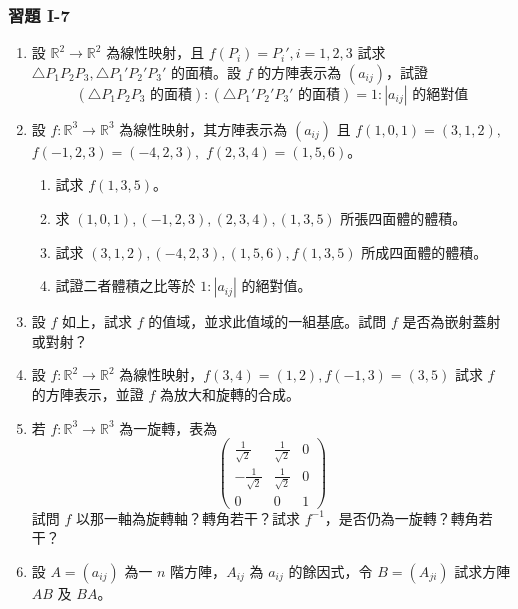 \subsubsection*{習題 I-7}\label{sec:b6-ex1-7}

\begin{enumerate}[label=\arabic*., leftmargin=2em]
  \item 設 $\mathbb{R}^2 \longrightarrow \mathbb{R}^2$ 為線性映射，且 $f(P_i)=P_i', i=1, 2, 3$ 試求 $\triangle P_1P_2P_3, \triangle P_1'P_2'P_3'$ 的面積。設 $f$ 的方陣表示為 $(a_{ij})$，試證
  \[ (\triangle P_1P_2P_3 \text{ 的面積}) : (\triangle P_1'P_2'P_3' \text{ 的面積}) = 1 : |a_{ij}| \text{ 的絕對值} \]

  \item 設 $f: \mathbb{R}^3 \longrightarrow \mathbb{R}^3$ 為線性映射，其方陣表示為 $(a_{ij})$ 且 $f(1, 0, 1) = (3, 1, 2),$ $f(-1, 2, 3) = (-4, 2, 3),$ $f(2, 3, 4) = (1, 5, 6)$。
  \begin{enumerate}[label=(\roman*)]
    \item 試求 $f(1, 3, 5)$。
    \item 求 $(1, 0, 1), (-1, 2, 3), (2, 3, 4), (1, 3, 5)$ 所張四面體的體積。
    \item 試求 $(3, 1, 2), (-4, 2, 3), (1, 5, 6), f(1, 3, 5)$ 所成四面體的體積。
    \item 試證二者體積之比等於 $1 : |a_{ij}|$ 的絕對值。
  \end{enumerate}

  \item[\textbf{*3.}] 設 $f$ 如上，試求 $f$ 的值域，並求此值域的一組基底。試問 $f$ 是否為嵌射蓋射或對射？

  \item 設 $f: \mathbb{R}^2 \longrightarrow \mathbb{R}^2$ 為線性映射，$f(3, 4) = (1, 2), f(-1, 3) = (3, 5)$ 試求 $f$ 的方陣表示，並證 $f$ 為放大和旋轉的合成。

  \item[\textbf{*5.}] 若 $f: \mathbb{R}^3 \longrightarrow \mathbb{R}^3$ 為一旋轉，表為
  \[ \begin{pmatrix}
  \frac{1}{\sqrt{2}} & \frac{1}{\sqrt{2}} & 0 \\
  -\frac{1}{\sqrt{2}} & \frac{1}{\sqrt{2}} & 0 \\
  0 & 0 & 1
  \end{pmatrix} \]
  試問 $f$ 以那一軸為旋轉軸？轉角若干？試求 $f^{-1}$，是否仍為一旋轉？轉角若干？

  \item[\textbf{*6.}] 設 $A=(a_{ij})$ 為一 $n$ 階方陣，$A_{ij}$ 為 $a_{ij}$ 的餘因式，令 $B=(A_{ji})$ 試求方陣 $AB$ 及 $BA$。


\end{enumerate}
